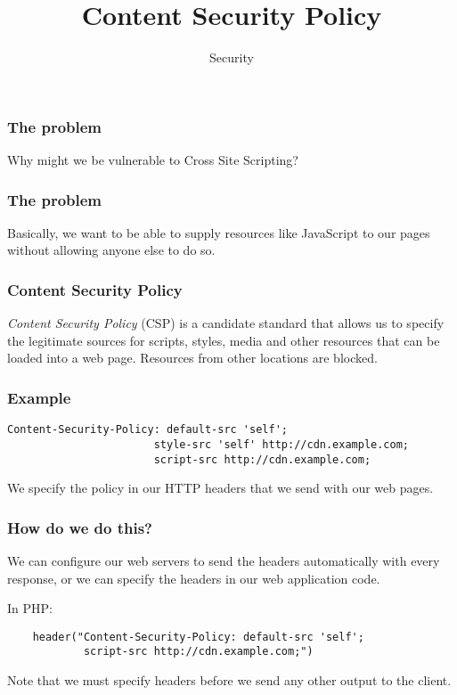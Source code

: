 \documentclass[10pt]{beamer}
\title{Content Security Policy}
\author[IN618]{Security}
\institute[Otago Polytechnic]{
  Otago Polytechnic \\
  Dunedin, New Zealand \\
}
\date{}
\begin{document}
\begin{frame}[plain]
  \titlepage
\end{frame}


\begin{frame}
	\frametitle{The problem}
	
	Why might we be vulnerable to Cross Site Scripting?
	
\end{frame}

\begin{frame}
	\frametitle{The problem}
	
	Basically, we want to be able to supply resources like JavaScript 
	to our pages without allowing anyone else to do so.
	
	
\end{frame}

\begin{frame}
	\frametitle{Content Security Policy}

	\emph{Content Security Policy} (CSP) is a candidate standard that allows us to 
	specify the legitimate sources for scripts, styles, media and other resources that
	can be loaded into a web page. Resources from other locations are blocked.
	 
\end{frame}
\begin{frame}[fragile]
	\frametitle{Example}

	\begin{verbatim}
Content-Security-Policy: default-src 'self'; 
                       style-src 'self' http://cdn.example.com; 
                       script-src http://cdn.example.com;
	\end{verbatim}
	
	We specify the policy in our HTTP headers that we send with our web pages.
	
\end{frame}

\begin{frame}[fragile]
	\frametitle{How do we do this?}
	
	We can configure our web servers to send the headers automatically with every response, or
	we can specify the headers in our web application code.
	
	In PHP:
	\begin{verbatim}
	header("Content-Security-Policy: default-src 'self'; 
	        script-src http://cdn.example.com;")
	\end{verbatim}
	
	Note that we must specify headers before we send any other output to the client.
	
\end{frame}
\end{document}

